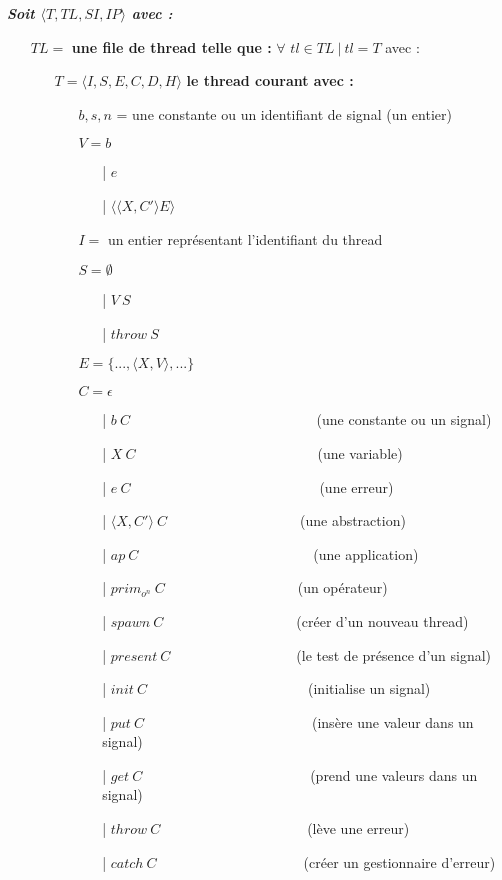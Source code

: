 \documentclass[10pt,a4paper]{report}
\begin{document}
	\textbf{\textit{Soit $\langle T,TL,SI,IP\rangle$ avec :}}
	
	\begin{itemize}
		\item[] $TL =$ \textbf{une file de thread telle que :} $\forall$ $tl \in TL~|~tl = T$ avec :
		\begin{itemize}
			\item[] $T = \langle I,S,E,C,D,H\rangle$ \textbf{le thread courant avec :}
			\begin{itemize}
				\item[] $b,s,n$ = une constante ou un identifiant de signal (un entier)
				\item[] $V = b$	
				\begin{itemize}
					\item[|] $e$
					\item[|] $\langle\langle X,C' \rangle E\rangle$
				\end{itemize}
				\item[] $I =$ un entier représentant l'identifiant du thread
				\item[] $S =  \emptyset$ 
				\begin{itemize}
					\item[|] $V~S$
					\item[|] $throw~S$
				\end{itemize}
				\item[] $E = \{...,\langle X,V\rangle,...\}$
				\item[] $C = \epsilon$
				\begin{itemize}
					\item[|] $b~C$~~~~~~~~~~~~~~~~~~~~~~~~~~ (une constante ou un signal)
					\item[|] $X~C$~~~~~~~~~~~~~~~~~~~~~~~~~~(une variable)
					\item[|] $e~C$~~~~~~~~~~~~~~~~~~~~~~~~~~~(une erreur)
					\item[|] $\langle X,C'\rangle~C$~~~~~~~~~~~~~~~~~~~(une abstraction)
					\item[|] $ap~C$~~~~~~~~~~~~~~~~~~~~~~~~~(une application)
					\item[|] $prim_{o^{n}}~C$~~~~~~~~~~~~~~~~~~~(un opérateur)
					\item[|] $spawn~C$~~~~~~~~~~~~~~~~~~~(créer d'un nouveau thread)
					\item[|] $present~C$~~~~~~~~~~~~~~~~~~(le test de présence d'un signal)
					\item[|] $init~C$~~~~~~~~~~~~~~~~~~~~~~~(initialise un signal)
					\item[|] $put~C$~~~~~~~~~~~~~~~~~~~~~~~~(insère une valeur dans un signal)
					\item[|] $get~C$~~~~~~~~~~~~~~~~~~~~~~~~(prend une valeurs dans un signal)
					\item[|] $throw~C$~~~~~~~~~~~~~~~~~~~~~(lève une erreur)
					\item[|] $catch~C$~~~~~~~~~~~~~~~~~~~~~(créer un gestionnaire d'erreur)
					

\end{itemize}
\end{itemize}
\end{itemize}
\end{itemize}
\end{document}
